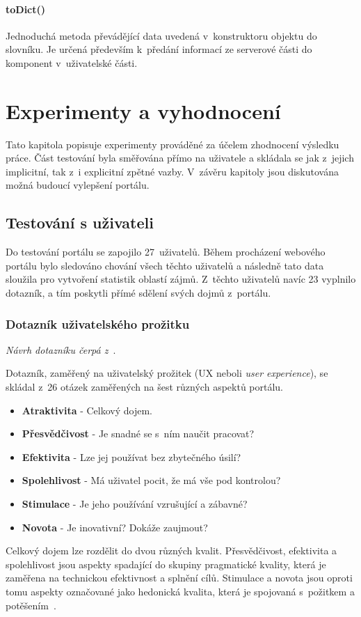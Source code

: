 \subsubsection*{toDict()}
Jednoduchá metoda převádějící data uvedená v~konstruktoru objektu do slovníku. Je určená především k~předání informací ze serverové části do komponent v~uživatelské části.



\chapter{Experimenty a vyhodnocení}
Tato kapitola popisuje experimenty prováděné za účelem zhodnocení výsledku práce. Část testování byla směřována přímo na uživatele a skládala se jak z~jejich implicitní, tak z~i explicitní zpětné vazby. V~závěru kapitoly jsou diskutována možná budoucí vylepšení portálu.

\section{Testování s uživateli}
Do testování portálu se zapojilo 27~uživatelů. Během procházení webového portálu bylo sledováno chování všech těchto uživatelů a následně tato data sloužila pro vytvoření statistik oblastí zájmů. Z~těchto uživatelů navíc 23 vyplnilo dotazník, a tím poskytli přímé sdělení svých dojmů z~portálu. 

\subsection{Dotazník uživatelského prožitku}
\emph{Návrh dotazníku čerpá z~\cite{bib:ueq}}.

Dotazník, zaměřený na uživatelský prožitek (UX neboli \emph{user experience}), se skládal z~26 otázek zaměřených na šest různých aspektů portálu.
\begin{itemize}
    \item \textbf{Atraktivita} - Celkový dojem.
    \item \textbf{Přesvědčivost} - Je snadné se s~ním naučit pracovat?
    \item \textbf{Efektivita} - Lze jej používat bez zbytečného úsilí?
    \item \textbf{Spolehlivost} - Má uživatel pocit, že má vše pod kontrolou?
    \item \textbf{Stimulace} - Je jeho používání vzrušující a zábavné?
    \item \textbf{Novota} - Je inovativní? Dokáže zaujmout?
\end{itemize}
Celkový dojem lze rozdělit do dvou různých kvalit. Přesvědčivost, efektivita a spolehlivost jsou aspekty spadající do skupiny pragmatické kvality, která je zaměřena na technickou efektivnost a splnění cílů. Stimulace a novota jsou oproti tomu aspekty označované jako hedonická kvalita, která je spojovaná s~požitkem a potěšením~\cite{bib:hedonic}.

